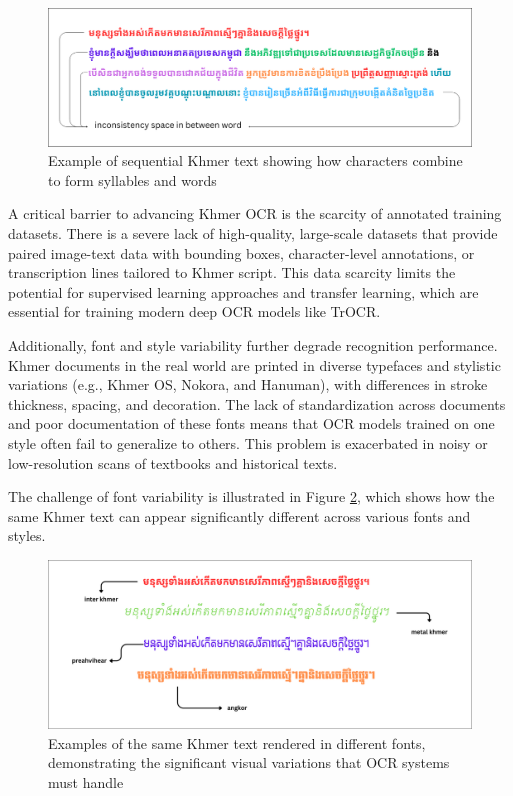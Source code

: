 \begin{figure}[ht]
    \centering
    \includegraphics[width=\textwidth]{figures/example_of_long_text.png}
    \caption{Example of sequential Khmer text showing how characters combine to form syllables and words}
    \label{fig:sequential_text}
\end{figure}


A critical barrier to advancing Khmer OCR is the scarcity of annotated training datasets. There is a severe lack of high-quality, large-scale datasets that provide paired image-text data with bounding boxes, character-level annotations, or transcription lines tailored to Khmer script. This data scarcity limits the potential for supervised learning approaches and transfer learning, which are essential for training modern deep OCR models like TrOCR.


Additionally, font and style variability further degrade recognition performance. Khmer documents in the real world are printed in diverse typefaces and stylistic variations (e.g., Khmer OS, Nokora, and Hanuman), with differences in stroke thickness, spacing, and decoration. The lack of standardization across documents and poor documentation of these fonts means that OCR models trained on one style often fail to generalize to others. This problem is exacerbated in noisy or low-resolution scans of textbooks and historical texts.

The challenge of font variability is illustrated in Figure \ref{fig:font_variants}, which shows how the same Khmer text can appear significantly different across various fonts and styles.

\begin{figure}[ht]
    \centering
    \includegraphics[width=\textwidth]{figures/varianty_of_font.png}
    \caption{Examples of the same Khmer text rendered in different fonts, demonstrating the significant visual variations that OCR systems must handle}
    \label{fig:font_variants}
\end{figure}


